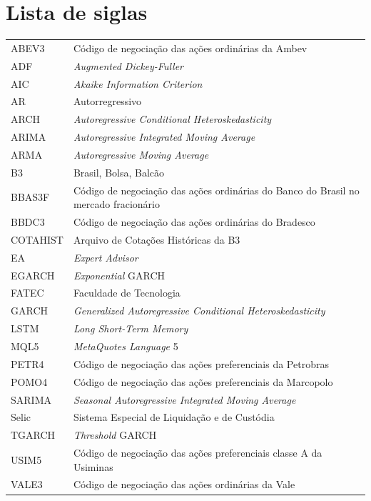 \chapter*{Lista de siglas}
\begingroup
\SingleSpacing
\renewcommand{\arraystretch}{1.6}
\noindent\begin{tabular}{@{}l@{\hspace{1.5em}}p{}@{}}
ABEV3   & Código de negociação das ações ordinárias da Ambev \\
ADF     & \textit{Augmented Dickey-Fuller} \\
AIC     & \textit{Akaike Information Criterion} \\
AR      & Autorregressivo \\
ARCH    & \textit{Autoregressive Conditional Heteroskedasticity} \\
ARIMA   & \textit{Autoregressive Integrated Moving Average} \\
ARMA    & \textit{Autoregressive Moving Average} \\
B3      & Brasil, Bolsa, Balcão \\
BBAS3F  & Código de negociação das ações ordinárias do Banco do Brasil no mercado fracionário \\
BBDC3   & Código de negociação das ações ordinárias do Bradesco \\
COTAHIST & Arquivo de Cotações Históricas da B3 \\
EA      & \textit{Expert Advisor} \\
EGARCH  & \textit{Exponential} GARCH \\
FATEC   & Faculdade de Tecnologia \\
GARCH   & \textit{Generalized Autoregressive Conditional Heteroskedasticity} \\
LSTM    & \textit{Long Short-Term Memory} \\
MQL5    & \textit{MetaQuotes Language} 5 \\
PETR4   & Código de negociação das ações preferenciais da Petrobras \\
POMO4   & Código de negociação das ações preferenciais da Marcopolo \\
SARIMA  & \textit{Seasonal Autoregressive Integrated Moving Average} \\
Selic   & Sistema Especial de Liquidação e de Custódia \\
TGARCH  & \textit{Threshold} GARCH \\
USIM5   & Código de negociação das ações preferenciais classe A da Usiminas \\
VALE3   & Código de negociação das ações ordinárias da Vale \\
\end{tabular}
\endgroup
\cleardoublepage
